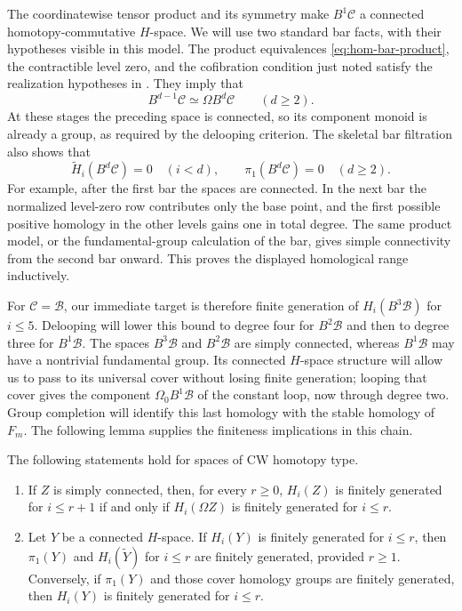 The coordinatewise tensor product and its symmetry make
$B^1\mathcal C$ a connected homotopy-commutative $H$-space.
We will use two standard bar facts, with their hypotheses visible in
this model.  The product equivalences
\eqref{eq:hom-bar-product}, the contractible level zero, and the
cofibration condition just noted satisfy the realization hypotheses in
\cite[Proposition~1.5 and its preceding Note; Proposition~A.1 and
Definition~A.4]{Segal1974}.
They imply that
\begin{equation}\label{eq:hom-deloop}
 B^{d-1}\mathcal C\simeq\Omega B^d\mathcal C\qquad(d\geq2).
\end{equation}
At these stages the preceding space is connected, so its component
monoid is already a group, as required by the delooping criterion.
The skeletal bar filtration also shows that
\begin{equation}\label{eq:hom-connectivity}
 \widetilde H_i(B^d\mathcal C)=0\quad(i<d),
 \qquad \pi_1(B^d\mathcal C)=0\quad(d\geq2).
\end{equation}
For example, after the first bar the spaces are connected.  In the next
bar the normalized level-zero row contributes only the base point, and
the first possible positive homology in the other levels gains one in
total degree.  The same product model, or the fundamental-group
calculation of the bar, gives simple connectivity from the second bar
onward.  This proves the displayed homological range inductively.

For $\mathcal C=\mathcal B$, our immediate target is therefore
finite generation of $H_i(B^3\mathcal B)$ for $i\leq5$.
Delooping will lower this bound to degree four for $B^2\mathcal B$
and then to degree three for $B^1\mathcal B$.  The spaces
$B^3\mathcal B$ and $B^2\mathcal B$ are simply connected, whereas
$B^1\mathcal B$ may have a nontrivial
fundamental group.  Its connected $H$-space structure will allow us
to pass to its universal cover without losing finite generation;
looping that cover gives the component $\Omega_0B^1\mathcal B$
of the constant loop, now through degree two.  Group completion
will identify this last homology with the stable homology of $F_m$.
The following lemma supplies the finiteness implications in this
chain.

\begin{lemma}\label{lem:hom-finiteness-transfers}
The following statements hold for spaces of CW homotopy type.
\begin{enumerate}[label=(\roman*)]
\item If $Z$ is simply connected, then, for every $r\geq0$,
$H_i(Z)$ is finitely generated for $i\leq r+1$ if and only if
$H_i(\Omega Z)$ is finitely generated for $i\leq r$.
\item Let $Y$ be a connected $H$-space.  If $H_i(Y)$ is finitely
generated for $i\leq r$, then $\pi_1(Y)$ and
$H_i(\widetilde Y)$ for $i\leq r$ are finitely generated, provided
$r\geq1$.  Conversely, if $\pi_1(Y)$ and those cover homology groups
are finitely generated, then $H_i(Y)$ is finitely generated for
$i\leq r$.
\end{enumerate}
\end{lemma}

